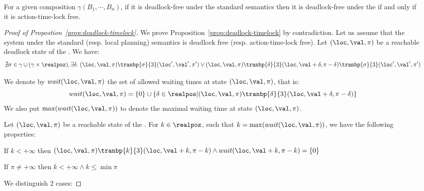 \begin{proposition}\label{prop:deadlock-timelock}
For a given composition $\gamma(B_1,\cdots,B_n)$, if it is deadlock-free under the standard semantics then it is deadlock-free under the \lps if and only if it is action-time-lock free.
\end{proposition}
\begin{proof}[Proof of Propostion~\ref{prop:deadlock-timelock}]
  We prove Proposition~\ref{prop:deadlock-timelock} by contradiction.
  Let us assume that the system under the standard (resp. local planning) semantics is
  deadlock free (resp. action-time-lock free).
  Let $(\loc,\val,\pi)$ be a reachable deadlock state of the \lpsabr. We have:
  \begin{displaymath}
    \nexists\sigma\in\gamma\cup(\gamma\times\realpoz),\exists\delta.\ (\loc,\val,\pi)\tranbp{\sigma}{3}(\loc',\val',\pi')
    \vee(\loc,\val,\pi)\tranbp{\delta}{3}(\loc,\val+\delta,\pi-\delta)\tranbp{\sigma}{3}
    (\loc',\val',\pi')
  \end{displaymath}

  We denote by $wait(\loc,\val,\pi)$ the set of allowed waiting times at state $(\loc,\val,\pi)$, that is:
\begin{displaymath}
  wait(\loc,\val,\pi)=\{0\}\cup\{\delta\in\realpos|(\loc,\val,\pi)\tranbp{\delta}{3}(\loc,\val+\delta,\pi-\delta)\}
\end{displaymath}
We also put $\max(wait(\loc,\val,\pi))$ to denote the maximal waiting time at state $(\loc,\val,\pi)$.
\begin{lemma}\label{lemma:wait}
  Let $(\loc,\val,\pi)$ be a reachable state of the \lpsb. For $k\in\realpoz$, such
  that $k=\max(wait(\loc,\val,\pi))$, we have the following properties:
  \begin{description}[labelwidth=1.5cm]
    \item[\namedlabel{p1}{P1}] If $k<+\infty$ then $(\loc,\val,\pi)\tranbp{k}{3}(\loc,\val+k,\pi-k)\wedge wait(\loc,\val+k,\pi-k)=\{0\}$
    \item[\namedlabel{p2}{P2}] If $\pi\neq+\infty$ then $k<+\infty\wedge k\le\min\pi$
  \end{description}
 
\end{lemma}

We distinguish 2 cases:

\end{proof}
